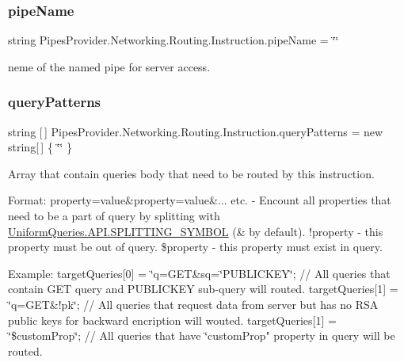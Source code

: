 \subsubsection{\texorpdfstring{pipe\+Name}{pipeName}}
{\footnotesize\ttfamily string Pipes\+Provider.\+Networking.\+Routing.\+Instruction.\+pipe\+Name = \char`\"{}\char`\"{}}



neme of the named pipe for server access. 

\mbox{\label{class_pipes_provider_1_1_networking_1_1_routing_1_1_instruction_aa98823848a42831095f92b639121cc67}} 
\subsubsection{\texorpdfstring{query\+Patterns}{queryPatterns}}
{\footnotesize\ttfamily string \mbox{[}$\,$\mbox{]} Pipes\+Provider.\+Networking.\+Routing.\+Instruction.\+query\+Patterns = new string\mbox{[}$\,$\mbox{]} \{ \char`\"{}\char`\"{} \}}



Array that contain querie\textquotesingle{}s body that need to be routed by this instruction. 

Format\+: property=value\&property=value\&... etc. -\/ Encount all properties that need to be a part of query by splitting with \mbox{\hyperlink{class_uniform_queries_1_1_a_p_i_aa906970223172f9f2068baa410b621d8}{Uniform\+Queries.\+A\+P\+I.\+S\+P\+L\+I\+T\+T\+I\+N\+G\+\_\+\+S\+Y\+M\+B\+OL}} (\textquotesingle{}\&\textquotesingle{} by default). !property -\/ this property must be out of query. \$property -\/ this property must exist in query.

Example\+: target\+Queries\mbox{[}0\mbox{]} = \char`\"{}q=\+G\+E\+T\&sq=\char`\"{}P\+U\+B\+L\+I\+C\+K\+EY\char`\"{};   // All queries that contain G\+E\+T query and P\+U\+B\+L\+I\+C\+K\+E\+Y sub-\/query will routed.
target\+Queries\mbox{[}1\mbox{]} = \char`\"{}q=G\+ET\&!pk\char`\"{};             // All queries that request data from server but has no R\+S\+A public keys for backward encription will wouted.
target\+Queries\mbox{[}1\mbox{]} = \char`\"{}\$custom\+Prop\char`\"{};           // All queries that have \char`\"{}custom\+Prop" property in query will be routed. \mbox{\label{class_pipes_provider_1_1_networking_1_1_routing_1_1_instruction_adb75f80ff34fab644305856ccf23d07b}} 
